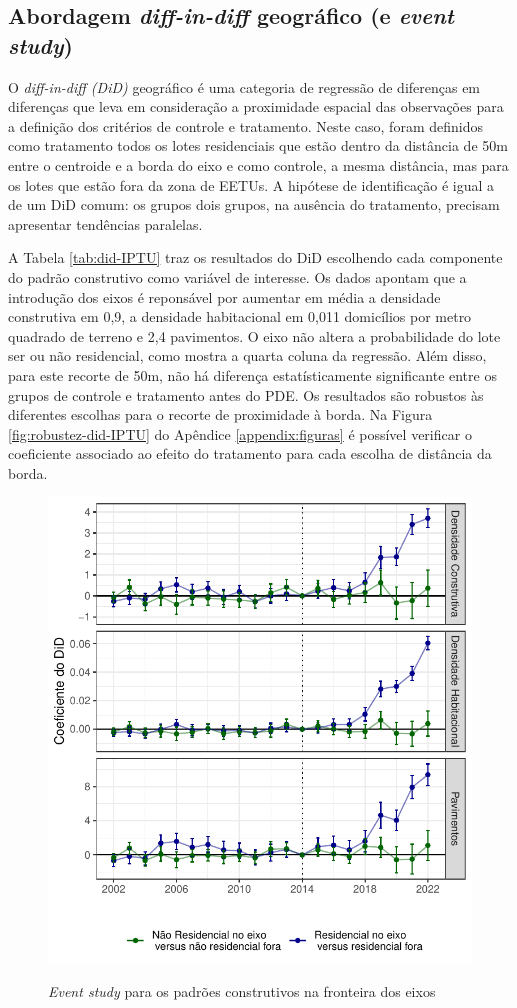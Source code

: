 \subsection{Abordagem \textit{diff-in-diff} geográfico (e \textit{event study})}

O \textit{diff-in-diff (DiD)} geográfico é uma categoria de regressão de diferenças em diferenças que leva em consideração a proximidade espacial das observações para a definição dos critérios de controle e tratamento. Neste caso, foram definidos como tratamento todos os lotes residenciais que estão dentro da distância de 50m entre o centroide e a borda do eixo e como controle, a mesma distância, mas para os lotes que estão fora da zona de EETUs. A hipótese de identificação é igual a de um DiD comum: os grupos dois grupos, na ausência do tratamento, precisam apresentar tendências paralelas. 



A Tabela \ref{tab:did-IPTU} traz os resultados do DiD escolhendo cada componente do padrão construtivo como variável de interesse. Os dados apontam que a introdução dos eixos é reponsável por aumentar em média a densidade construtiva em 0,9, a densidade habitacional em 0,011 domicílios por metro quadrado de terreno e 2,4 pavimentos. O eixo não altera a probabilidade do lote ser ou não residencial, como mostra a quarta coluna da regressão. Além disso, para este recorte de 50m, não há diferença estatísticamente significante entre os grupos de controle e tratamento antes do PDE. Os resultados são robustos às diferentes escolhas para o recorte de proximidade à borda. Na Figura \ref{fig:robustez-did-IPTU} do Apêndice \ref{appendix:figuras} é possível verificar o coeficiente associado ao efeito do tratamento para cada escolha de distância da borda. 

\begin{figure}[!h]
    \centering
    \caption{\textit{Event study} para os padrões construtivos na fronteira dos eixos}
    \includegraphics[width = .7\textwidth]{figuras/event-study.pdf}
    \label{fig:event-study}
\end{figure}

